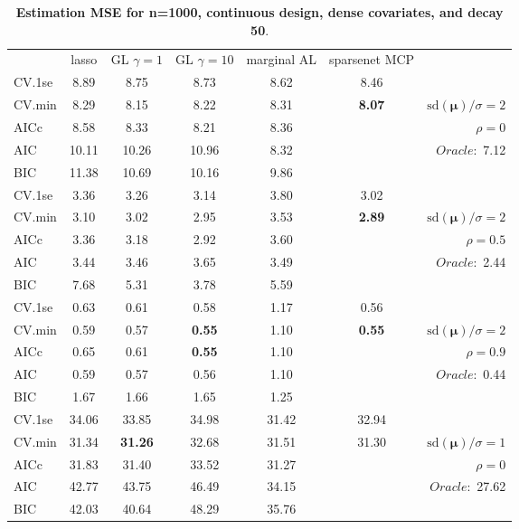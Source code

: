 \clearpage
\begin{table}\vspace{-.5cm}
\caption[l]{ { \bf Estimation MSE for n=1000, continuous design, 
dense covariates, and  decay  50}.}
\vspace{-.5cm}
\footnotesize{}
\begin{center}
\begin{tabular}{l*{5}{c}|r}
& lasso & GL $\gamma=1$ & GL $\gamma=10$ & marginal AL & sparsenet MCP  & \\
 \cline{1-7}
CV.1se & 8.89 & 8.75 & 8.73 & 8.62 & 8.46 & \\
CV.min & 8.29 & 8.15 & 8.22 & 8.31 & {\bf 8.07} &  $\mathrm{sd}(\mathbf{\mu})/\sigma=2$ \\
AICc & 8.58 & 8.33 & 8.21 & 8.36 & & $\rho=0$ \\
AIC & 10.11 & 10.26 & 10.96 & 8.32 & &  \multirow{2}{*}{$Oracle: $ 7.12} \\
BIC & 11.38 & 10.69 & 10.16 & 9.86 & &  \\
 \hline 
CV.1se & 3.36 & 3.26 & 3.14 & 3.80 & 3.02 & \\
CV.min & 3.10 & 3.02 & 2.95 & 3.53 & {\bf 2.89} &  $\mathrm{sd}(\mathbf{\mu})/\sigma=2$ \\
AICc & 3.36 & 3.18 & 2.92 & 3.60 & & $\rho=0.5$ \\
AIC & 3.44 & 3.46 & 3.65 & 3.49 & &  \multirow{2}{*}{$Oracle: $ 2.44} \\
BIC & 7.68 & 5.31 & 3.78 & 5.59 & &  \\
 \hline 
CV.1se & 0.63 & 0.61 & 0.58 & 1.17 & 0.56 & \\
CV.min & 0.59 & 0.57 & {\bf 0.55} & 1.10 & {\bf 0.55} &  $\mathrm{sd}(\mathbf{\mu})/\sigma=2$ \\
AICc & 0.65 & 0.61 & {\bf 0.55} & 1.10 & & $\rho=0.9$ \\
AIC & 0.59 & 0.57 & 0.56 & 1.10 & &  \multirow{2}{*}{$Oracle: $ 0.44} \\
BIC & 1.67 & 1.66 & 1.65 & 1.25 & &  \\
 \hline 
CV.1se & 34.06 & 33.85 & 34.98 & 31.42 & 32.94 & \\
CV.min & 31.34 & {\bf 31.26} & 32.68 & 31.51 & 31.30 &  $\mathrm{sd}(\mathbf{\mu})/\sigma=1$ \\
AICc & 31.83 & 31.40 & 33.52 & 31.27 & & $\rho=0$ \\
AIC & 42.77 & 43.75 & 46.49 & 34.15 & &  \multirow{2}{*}{$Oracle: $ 27.62} \\
BIC & 42.03 & 40.64 & 48.29 & 35.76 & &  \\

\end{tabular}
\end{center}
\end{table}
